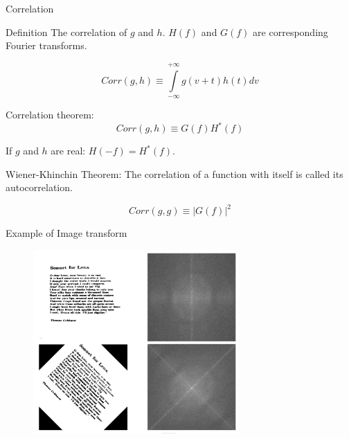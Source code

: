 \documentclass[10pt]{beamer}
\begin{document}
\begin{frame}{Correlation}

\begin{block}{Definition}
    The correlation of $g$ and $h$.  $H(f)$ and $G(f)$ are corresponding Fourier transforms. 
    
    \begin{equation}
        Corr(g, h) \equiv \int \limits_{-\infty}^{+\infty} g(v+t)h(t) dv
    \end{equation}
\end{block}

\begin{block}{Correlation theorem:}
\begin{equation}
    Corr(g, h) \equiv G(f) H^{*}(f)
\end{equation}

If $g$ and $h$ are real: $H(-f) = H^{*}(f)$.    
\end{block}

\begin{block}{Wiener-Khinchin Theorem:}
The correlation of a function with itself is
called its autocorrelation. 

\begin{equation}
    Corr(g, g) \equiv |G(f)|^2
\end{equation}
\end{block}
\end{frame}


\begin{frame}{Example of Image transform}

\begin{figure}
    \centering
    \includegraphics[width=0.7\textwidth]{fourier.jpg}
\end{figure}
    
\end{frame}
\end{document}
